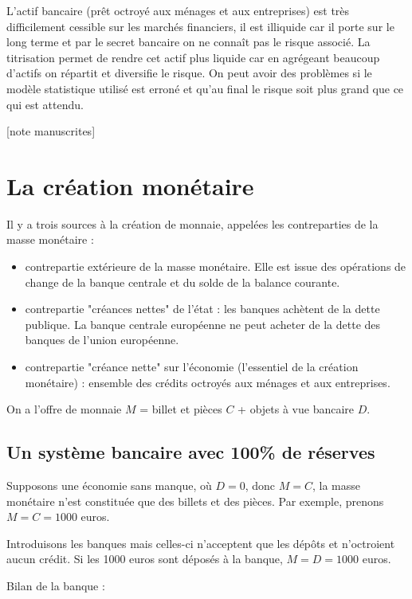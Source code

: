 	L'actif bancaire (prêt octroyé aux ménages et aux entreprises) est très difficilement cessible sur les marchés financiers, il est illiquide car il porte sur le long terme et par le secret bancaire on ne connaît pas le risque associé. La titrisation permet de rendre cet actif plus liquide car en agrégeant beaucoup d'actifs on répartit et diversifie le risque. On peut avoir des problèmes si le modèle statistique utilisé est erroné et qu'au final le risque soit plus grand que ce qui est attendu.
	
	[note manuscrites]
	
\section{La création monétaire}

Il y a trois sources à la création de monnaie, appelées les contreparties de la masse monétaire :

\begin{itemize}
	\item contrepartie extérieure de la masse monétaire. Elle est issue des opérations de change de la banque centrale et du solde de la balance courante.
	
	\item contrepartie "créances nettes" de l'état : les banques achètent de la dette publique. La banque centrale européenne ne peut acheter de la dette des banques de l'union européenne.
	\item contrepartie "créance nette" sur l'économie (l'essentiel de la création monétaire) : ensemble des crédits octroyés aux ménages et aux entreprises.
\end{itemize}

On a l'offre de monnaie $M$ = billet et pièces $C$ + objets à vue bancaire $D$.

	\subsection{Un système bancaire avec 100\% de réserves}
	
	Supposons une économie sans manque, où $D = 0$, donc $M = C$, la masse monétaire n'est constituée que des billets et des pièces. Par exemple, prenons $M = C = 1000$ euros.
	
	Introduisons les banques mais celles-ci n'acceptent que les dépôts et n'octroient aucun crédit. Si les 1000 euros sont déposés à la banque, $M = D = 1000$ euros.
	
	Bilan de la banque :
	
